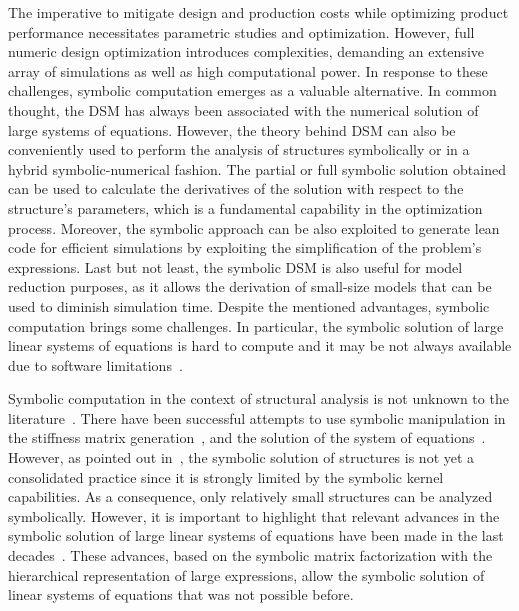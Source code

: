 The imperative to mitigate design and production costs while optimizing product performance necessitates parametric studies and optimization. However, full numeric design optimization introduces complexities, demanding an extensive array of simulations as well as high computational power. In response to these challenges, symbolic computation emerges as a valuable alternative. In common thought, the \ac{DSM} has always been associated with the numerical solution of large systems of equations. However, the theory behind \ac{DSM} can also be conveniently used to perform the analysis of structures symbolically or in a hybrid symbolic-numerical fashion. The partial or full symbolic solution obtained can be used to calculate the derivatives of the solution with respect to the structure's parameters, which is a fundamental capability in the optimization process. Moreover, the symbolic approach can be also exploited to generate lean code for efficient simulations by exploiting the simplification of the problem's expressions. Last but not least, the symbolic \ac{DSM} is also useful for model reduction purposes, as it allows the derivation of small-size models that can be used to diminish simulation time. Despite the mentioned advantages, symbolic computation brings some challenges. In particular, the symbolic solution of large linear systems of equations is hard to compute and it may be not always available due to software limitations~\cite{carette2006linear, zhou2007symbolic}.

Symbolic computation in the context of structural analysis is not unknown to the literature~\cite{noor1979computerized, pavlovic2003symbolic}. There have been successful attempts to use symbolic manipulation in the stiffness matrix generation~\cite{cecchi1977automatic}, and the solution of the system of equations~\cite{ioakimidis1992application, beltzer2012variational}. However, as pointed out in~\cite{pavlovic2003symbolic}, the symbolic solution of structures is not yet a consolidated practice since it is strongly limited by the symbolic kernel capabilities. As a consequence, only relatively small structures can be analyzed symbolically. However, it is important to highlight that relevant advances in the symbolic solution of large linear systems of equations have been made in the last decades~\cite{carette2006linear, zhou2007symbolic}. These advances, based on the symbolic matrix factorization with the hierarchical representation of large expressions, allow the symbolic solution of linear systems of equations that was not possible before.

